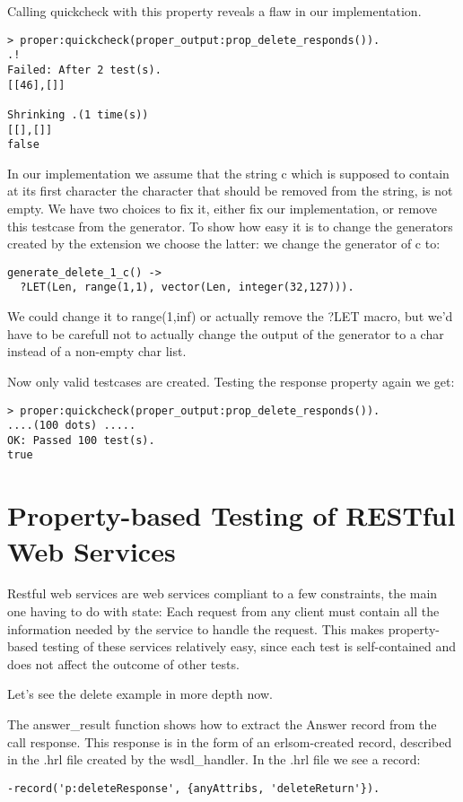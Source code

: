 \documentclass[submission,copyright,a4]{eptcs}
\begin{document}
Calling quickcheck with this property reveals a flaw in our implementation.
\begin{lstlisting}
> proper:quickcheck(proper_output:prop_delete_responds()). 
.!
Failed: After 2 test(s).
[[46],[]]

Shrinking .(1 time(s))
[[],[]]
false
\end{lstlisting}

In our implementation we assume that the string c which is supposed to contain at its first character the character that should be removed from the string, is not empty. We have two choices to fix it, either fix our implementation, or remove this testcase from the generator. To show how easy it is to change the generators created by the extension we choose the latter: we change the generator of c to:

\begin{lstlisting}
generate_delete_1_c() ->
  ?LET(Len, range(1,1), vector(Len, integer(32,127))).
\end{lstlisting}
We could change it to range(1,inf) or actually remove the ?LET macro, but we'd have to be carefull not to actually change the output of the generator to a char instead of a non-empty char list.

Now only valid testcases are created. Testing the response property again we get:
\begin{lstlisting}
> proper:quickcheck(proper_output:prop_delete_responds()).
....(100 dots) .....
OK: Passed 100 test(s).
true
\end{lstlisting}

\section{Property-based Testing of RESTful Web Services}

Restful web services are web services compliant to a few constraints, the main one having to do with state: Each request from any client must contain all the information needed by the service to handle the request. This makes property-based testing of these services relatively easy, since each test is self-contained and does not affect the outcome of other tests. 

Let's see the delete example in more depth now. 

The answer\_result function shows how to extract the Answer record from the call response. This response is in the form of an erlsom-created record, described in the .hrl file created by the wsdl\_handler. In the .hrl file we see a record: 
\begin{lstlisting}
-record('p:deleteResponse', {anyAttribs, 'deleteReturn'}).
\end{lstlisting}
\end{document}

